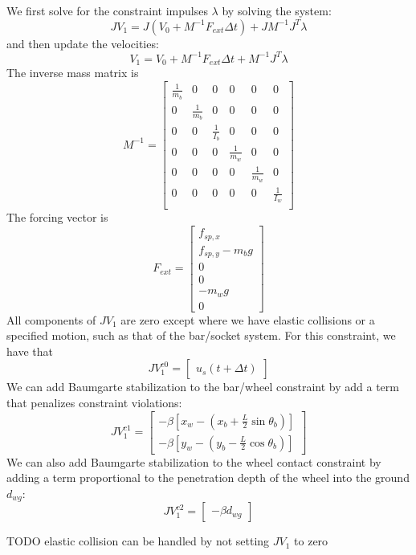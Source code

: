 \documentclass[9pt]{article}
\begin{document}
We first solve for the constraint impulses $\lambda$ by solving the system:
\[
J V_1 = J (V_0 + M^{-1} F_{ext} \Delta t) + J M^{-1} J^T \lambda
\]
and then update the velocities:
\[
V_1 = V_0 + M^{-1} F_{ext} \Delta t + M^{-1} J^T \lambda
\]
The inverse mass matrix is 
\[
M^{-1} = 
\left[
\begin{array}{cccccc}
\frac{1}{m_b} & 0 & 0 & 0 & 0 & 0 \\
0 & \frac{1}{m_b} & 0 & 0 & 0 & 0 \\
0 & 0 & \frac{1}{I_b} & 0 & 0 & 0 \\
0 & 0 & 0 & \frac{1}{m_w} & 0 & 0 \\
0 & 0 & 0 & 0 & \frac{1}{m_w} & 0 \\
0 & 0 & 0 & 0 & 0 & \frac{1}{I_w} \\
\end{array} 
\right]
\]
The forcing vector is 
\[
F_{ext} = 
\left[
\begin{array}{c}
f_{sp,x} \\
f_{sp,y} - m_b g \\
0 \\
0 \\
-m_w g \\
0
\end{array} 
\right]
\]
All components of $JV_1$ are zero except where we have elastic collisions or a specified motion, such as that of the bar/socket system. For this constraint, we have that 
\[
JV_1^{c0} = 
\left[
\begin{array}{c}
u_s(t + \Delta t)
\end{array} 
\right]
\]
We can add Baumgarte stabilization to the bar/wheel constraint by add a term that penalizes constraint violations:
\[
JV_1^{c1} = 
\left[
\begin{array}{c}
-\beta \left[x_w - \left(x_b + \frac{L}{2}\sin \theta_b\right)\right] \\
-\beta \left[y_w - \left(y_b - \frac{L}{2}\cos \theta_b\right)\right]
\end{array} 
\right]
\]
We can also add Baumgarte stabilization to the wheel contact constraint by adding a term proportional to the penetration depth of the wheel into the ground $d_{wg}$:
\[
JV_1^{c2} = 
\left[
\begin{array}{c}
-\beta d_{wg}
\end{array} 
\right]
\]

TODO elastic collision can be handled by not setting $JV_1$ to zero
\end{document}
